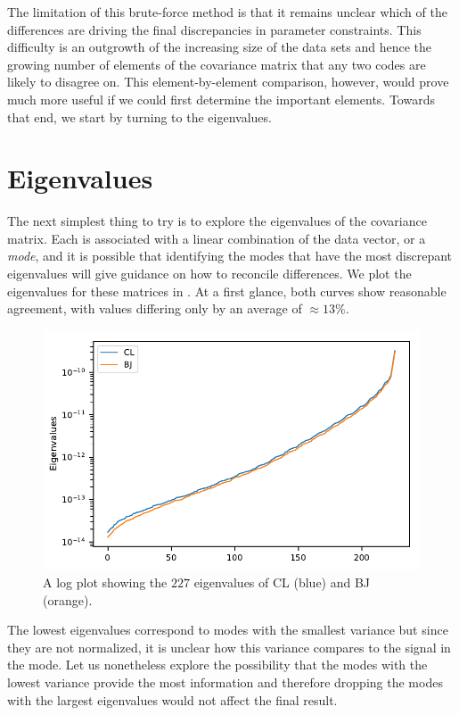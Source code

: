\documentclass[twocolumn]{\docclass}
\newcommand\scott[1]{{\bf [Scott: #1]}}
\begin{document}
	The limitation of this brute-force method is that it remains unclear which of the differences are driving the final discrepancies in parameter constraints. This difficulty is an outgrowth of the increasing size of the data sets and hence the growing number of elements of the covariance matrix that any two codes are likely to disagree on. This element-by-element comparison, however, would prove much more useful if we could first determine the important elements. Towards that end, we start by turning to the eigenvalues.
	
	\section{Eigenvalues}
	
	The next simplest thing to try is to explore the eigenvalues of the covariance matrix. Each is associated with a linear combination of the data vector, or a \emph{mode}, and it is possible that identifying the modes that have the most discrepant eigenvalues will give guidance on how to reconcile differences.  We plot the eigenvalues for these matrices in . At a first glance, both curves show reasonable agreement, with values differing only by an average of $\approx 13\%$.
	
	
	\begin{figure}
		\includegraphics[width=0.9\columnwidth]{Eigenvalues/Eigenvalues_Y1_BJ-DES.pdf}
		\caption{A log plot showing the $227$ eigenvalues of CL (blue) and BJ (orange). \label{fig:coveigen}}
	\end{figure}
	
	
	The lowest eigenvalues correspond to modes with the smallest variance but since they are not normalized, it is unclear how this variance compares to the signal in the mode. Let us nonetheless explore the possibility that the modes with the lowest variance provide the most information and therefore dropping the modes with the largest eigenvalues would not affect the final result.
	
\end{document}
